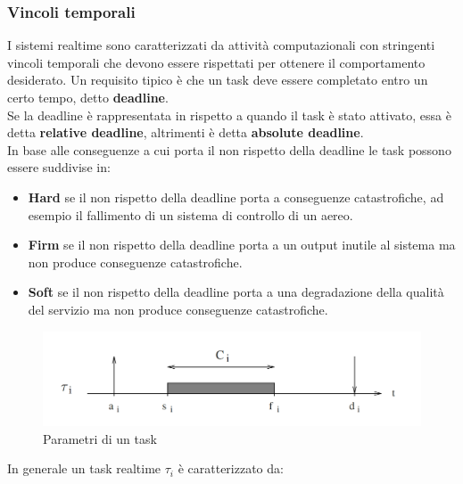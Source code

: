 \documentclass[12pt,openany,onesided]{book}
\begin{document}
\subsubsection{Vincoli temporali}
I sistemi realtime sono caratterizzati da attività computazionali con stringenti vincoli temporali che devono essere rispettati per ottenere il comportamento desiderato.
Un requisito tipico è che un task deve essere completato entro un certo tempo, detto \textbf{deadline}.\\
Se la deadline è rappresentata in rispetto a quando il task è stato attivato, essa è detta \textbf{relative deadline}, altrimenti è detta \textbf{absolute deadline}.\\
In base alle conseguenze a cui porta il non rispetto della deadline le task possono essere suddivise in:
\begin{itemize}
    \item \textbf{Hard} se il non rispetto della deadline porta a conseguenze catastrofiche, ad esempio il fallimento di un sistema di controllo di un aereo.
    \item \textbf{Firm} se il non rispetto della deadline porta a un output inutile al sistema ma non produce conseguenze catastrofiche.
    \item \textbf{Soft} se il non rispetto della deadline porta a una degradazione della qualità del servizio ma non produce conseguenze catastrofiche.
\end{itemize}
\begin{figure}[h]
    \includegraphics[width=\textwidth]{pictures/parametriTask.png}
    \caption{Parametri di un task}
\end{figure}
In generale un task realtime $\tau_i$ è caratterizzato da:
\end{document}
